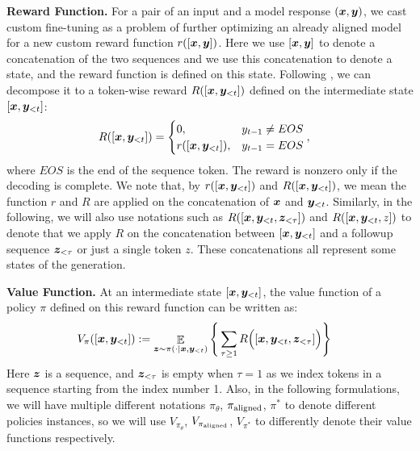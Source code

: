 \textbf{Reward Function.} For a pair of an input and a model response $(\bm{x}, \bm{y})$, we cast custom fine-tuning as a problem of further optimizing an already aligned model for a new custom reward function $r([\bm{x}, \bm{y}])$. Here we use $[\bm{x}, \bm{y}]$ to denote a concatenation of the two sequences and we use this concatenation to denote a state, and the reward function is defined on this state. Following \citet{mudgal2024controlled}, we can decompose it to a token-wise reward $R([\bm{x}, \bm{y}_{< t}])$ defined on the intermediate state $[\bm{x}, \bm{y}_{< t}]$:
\begin{align}
    & R([\bm{x}, \bm{y}_{< t}]) = 
    \begin{cases}
        0 , & y_{t-1} \ne EOS\\
        r([\bm{x}, \bm{y}_{< t}]) , & y_{t-1} = EOS 
    \end{cases},
\end{align}
where $EOS$ is the end of the sequence token. The reward is nonzero only if the decoding is complete. We note that, by $r([\bm{x}, \bm{y}_{<t}])$ and $R([\bm{x}, \bm{y}_{<t}])$, we mean the function $r$ and $R$ are applied on the concatenation of $\bm{x}$ and $\bm{y}_{<t}$. Similarly, in the following, we will also use notations such as $R([\bm{x}, \bm{y}_{<t}, \bm{z}_{<\tau}])$ and $R([\bm{x}, \bm{y}_{<t}, z])$ to denote that we apply $R$ on the concatenation between $[\bm{x}, \bm{y}_{<t}]$ and a followup sequence $\bm{z}_{<\tau}$ or just a single token $z$. These concatenations all represent some states of the generation.

\textbf{Value Function.}
At an intermediate state $[\bm{x}, \bm{y}_{< t}]$, the value function of a policy $\pi$ defined on this reward function can be written as:
\begin{align}
    & V_{\pi}([\bm{x}, \bm{y}_{< t}]) := \mathop{\mathbb E}_{\bm{z} \sim \pi( \cdot | \bm{x}, \bm{y}_{< t})} \Bigg\{ \sum_{\tau \ge 1} R\Big([\bm{x}, \bm{y}_{< t}, \bm{z}_{< \tau}]\Big)\Bigg\}
\end{align}
Here $\bm{z}$ is a sequence, and $\bm{z}_{< \tau}$ is empty when $\tau = 1$ as we index tokens in a sequence starting from the index number 1. Also, in the following formulations, we will have multiple different notations $\pi_{\theta}$, $\pi_{\mathrm{aligned}}$, $\pi^*$ to denote different policies instances, so we will use $V_{\pi_\theta}$, $V_{\pi_{\mathrm{aligned}}}$, $V_{\pi^*}$ to differently denote their value functions respectively. 


